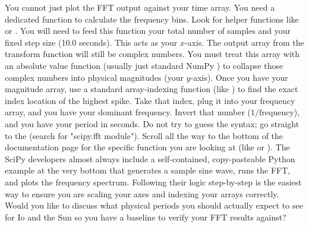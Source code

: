 \markdownRendererUlItem {} You cannot just plot the FFT output against your time array. You need a dedicated function to calculate the frequency bins. Look for helper functions like  or . You will need to feed this function your total number of samples and your fixed step size (10.0 seconds). This acts as your $x$-axis.\markdownRendererUlItemEnd 
\markdownRendererUlItem {} The output array from the transform function will still be complex numbers. You must treat this array with an absolute value function (usually just standard NumPy ) to collapse those complex numbers into physical magnitudes (your $y$-axis).\markdownRendererUlItemEnd 
\markdownRendererUlItem {} Once you have your magnitude array, use a standard array-indexing function (like ) to find the exact index location of the highest spike.\markdownRendererUlItemEnd 
\markdownRendererUlItem {} Take that index, plug it into your frequency array, and you have your dominant frequency. Invert that number ($1 / \text{frequency}$), and you have your period in seconds.\markdownRendererUlItemEnd 
\markdownRendererUlEnd \markdownRendererInterblockSeparator
{}
\markdownRendererSectionEnd \markdownRendererSectionBegin
{}\markdownRendererInterblockSeparator
{}Do not try to guess the syntax; go straight to the  (search for "scipy.fft module").\markdownRendererInterblockSeparator
{} Scroll all the way to the bottom of the documentation page for the specific function you are looking at (like  or ). The SciPy developers almost always include a self-contained, copy-pasteable Python example at the very bottom that generates a sample sine wave, runs the FFT, and plots the frequency spectrum. Following their logic step-by-step is the easiest way to ensure you are scaling your axes and indexing your arrays correctly.\markdownRendererInterblockSeparator
{}\markdownRendererThematicBreak{}\markdownRendererInterblockSeparator
{}Would you like to discuss what physical periods you should actually expect to see for Io and the Sun so you have a baseline to verify your FFT results against?\markdownRendererInterblockSeparator
